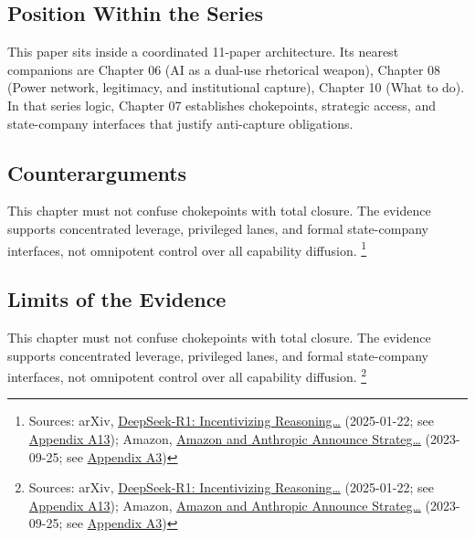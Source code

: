 \documentclass[
  american,
  11pt,
  letterpaper,
]{article}
\begin{document}
\subsection{Position Within the
Series}\label{position-within-the-series}

This paper sits inside a coordinated 11-paper architecture. Its nearest
companions are Chapter 06 (AI as a dual-use rhetorical weapon), Chapter
08 (Power network, legitimacy, and institutional capture), Chapter 10
(What to do). In that series logic, Chapter 07 establishes chokepoints,
strategic access, and state-company interfaces that justify anti-capture
obligations.

\subsection{Counterarguments}\label{counterarguments}

This chapter must not confuse chokepoints with total closure. The
evidence supports concentrated leverage, privileged lanes, and formal
state-company interfaces, not omnipotent control over all capability
diffusion. \footnote{Sources: arXiv,
  \href{https://arxiv.org/abs/2501.12948}{DeepSeek-R1: Incentivizing
  Reasoning\ldots{}} (2025-01-22; see
  \hyperref[appendix-a13-deepseek-r1-incentivizing-reasoning-capability-in-llms-via-reinforcement-learning]{Appendix
  A13}); Amazon,
  \href{https://press.aboutamazon.com/2023/9/amazon-and-anthropic-announce-strategic-collaboration-to-advance-generative-ai}{Amazon
  and Anthropic Announce Strateg\ldots{}} (2023-09-25; see
  \hyperref[appendix-a3-amazon-and-anthropic-announce-strategic-collaboration-to-advance-generative-ai]{Appendix
  A3})}

\subsection{Limits of the Evidence}\label{limits-of-the-evidence}

This chapter must not confuse chokepoints with total closure. The
evidence supports concentrated leverage, privileged lanes, and formal
state-company interfaces, not omnipotent control over all capability
diffusion. \footnote{Sources: arXiv,
  \href{https://arxiv.org/abs/2501.12948}{DeepSeek-R1: Incentivizing
  Reasoning\ldots{}} (2025-01-22; see
  \hyperref[appendix-a13-deepseek-r1-incentivizing-reasoning-capability-in-llms-via-reinforcement-learning]{Appendix
  A13}); Amazon,
  \href{https://press.aboutamazon.com/2023/9/amazon-and-anthropic-announce-strategic-collaboration-to-advance-generative-ai}{Amazon
  and Anthropic Announce Strateg\ldots{}} (2023-09-25; see
  \hyperref[appendix-a3-amazon-and-anthropic-announce-strategic-collaboration-to-advance-generative-ai]{Appendix
  A3})}
\end{document}
